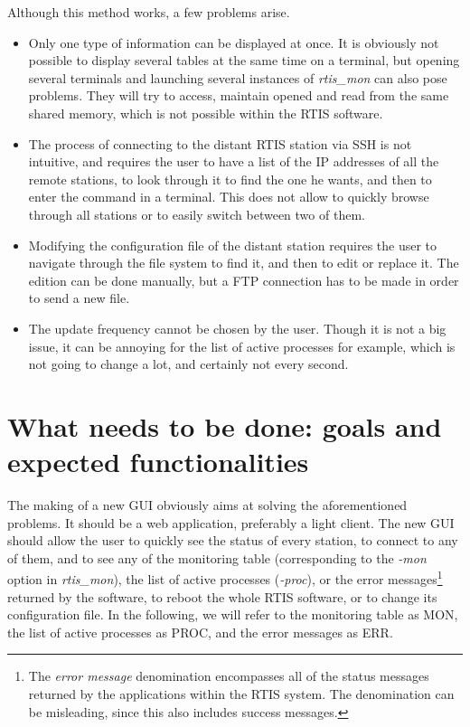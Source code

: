\documentclass{themeensg}
\begin{document}
Although this method works, a few problems arise.
\begin{itemize}
	\item Only one type of information can be displayed at once. It is obviously not possible to display several tables at the same time on a terminal, but opening several terminals and launching several instances of \textit{rtis\_mon} can also pose problems. They will try to access, maintain opened and read from the same shared memory, which is not possible within the RTIS software. \\
	\item The process of connecting to the distant RTIS station via SSH is not intuitive, and requires the user to have a list of the IP addresses of all the remote stations, to look through it to find the one he wants, and then to enter the command in a terminal. This does not allow to quickly browse through all stations or to easily switch between two of them.
	\item Modifying the configuration file of the distant station requires the user to navigate through the file system to find it, and then to edit or replace it. The edition can be done manually, but a FTP connection has to be made in order to send a new file.
	\item The update frequency cannot be chosen by the user. Though it is not a big issue, it can be annoying for the list of active processes for example, which is not going to change a lot, and certainly not every second.
\end{itemize}



\section{What needs to be done: goals and expected functionalities}

The making of a new GUI obviously aims at solving the aforementioned problems. It should be a web application, preferably a light client. The new GUI should allow the user to quickly see the status of every station, to connect to any of them, and to see any of the monitoring table (corresponding to the \textit{-mon} option in \textit{rtis\_mon}), the list of active processes (\textit{-proc}), or the error messages\footnote{The \textit{error message} denomination encompasses all of the status messages returned by the applications within the RTIS system. The denomination can be misleading, since this also includes success messages.} returned by the software, to reboot the whole RTIS software, or to change its configuration file. In the following, we will refer to the monitoring table as MON, the list of active processes as PROC, and the error messages as ERR.\\
\end{document}
